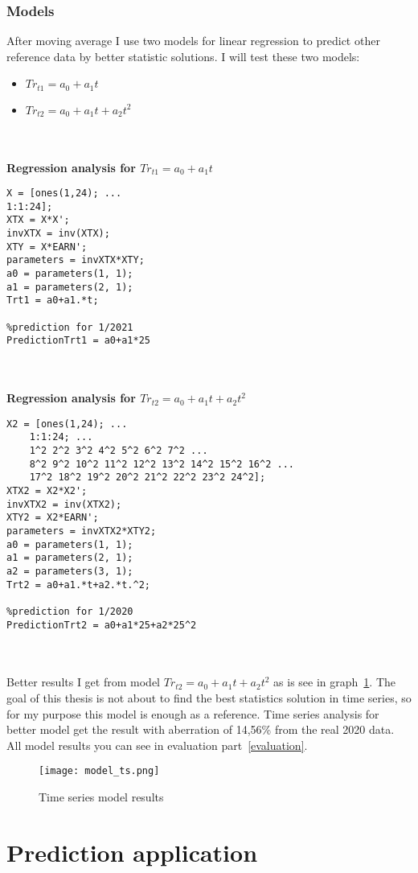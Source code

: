 \subsubsection{Models}
After moving average I use two models for linear regression to predict other reference data by better statistic solutions.
I will test these two models:
\begin{itemize}
    \item $Tr_{t1}=a_0+a_1t$
    \item $Tr_{t2}=a_0+a_1t+a_2t^2$
\end{itemize}\\
\\
\textbf{Regression analysis for $Tr_{t1}=a_0+a_1t$}\\
\begin{lstlisting}[language=mcode]
X = [ones(1,24); ...
1:1:24];
XTX = X*X';
invXTX = inv(XTX);
XTY = X*EARN';
parameters = invXTX*XTY;
a0 = parameters(1, 1);
a1 = parameters(2, 1);
Trt1 = a0+a1.*t;

%prediction for 1/2021
PredictionTrt1 = a0+a1*25
\end{lstlisting}\\
\\
\textbf{Regression analysis for $Tr_{t2}=a_0+a_1t+a_2t^2$}\\
\begin{lstlisting}[language=mcode]
X2 = [ones(1,24); ...
    1:1:24; ...
    1^2 2^2 3^2 4^2 5^2 6^2 7^2 ...
    8^2 9^2 10^2 11^2 12^2 13^2 14^2 15^2 16^2 ...
    17^2 18^2 19^2 20^2 21^2 22^2 23^2 24^2];
XTX2 = X2*X2';
invXTX2 = inv(XTX2);
XTY2 = X2*EARN';
parameters = invXTX2*XTY2;
a0 = parameters(1, 1);
a1 = parameters(2, 1);
a2 = parameters(3, 1);
Trt2 = a0+a1.*t+a2.*t.^2;

%prediction for 1/2020
PredictionTrt2 = a0+a1*25+a2*25^2
\end{lstlisting}\\
\\
Better results I get from model $Tr_{t2}=a_0+a_1t+a_2t^2$ as is see in graph~\ref{ts_models}.
The goal of this thesis is not about to find the best statistics solution in time series, so for my purpose this model is enough as a reference.
Time series analysis for better model get the result with aberration of 14,56\% from the real 2020 data.
All model results you can see in evaluation part~\ref{evaluation}.\\
\begin{figure}[h!]
    \begin{center}
        \texttt{[image: model\_ts.png]}
    \end{center}
    \caption{Time series model results}
    \label{ts_models}
\end{figure}
\newpage
\section{Prediction application} \label{sec:app}
